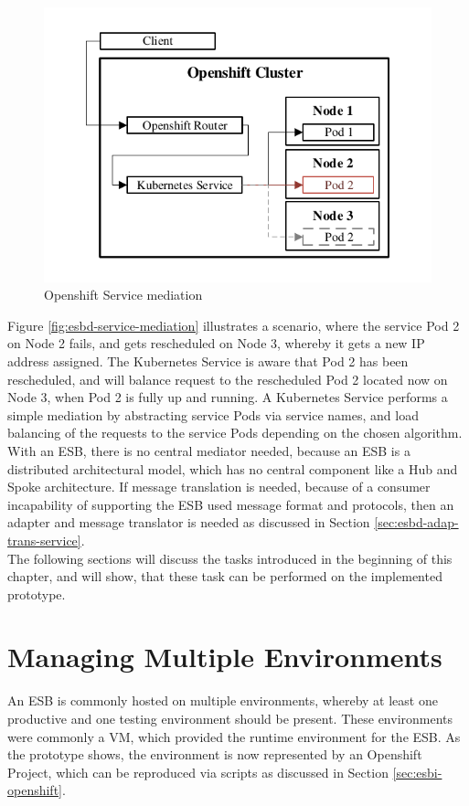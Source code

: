 \begin{figure}[htbp]
	\centering
	\includegraphics[scale=1]{images/esbd-service-mediation.pdf}
	\caption{Openshift Service mediation}
	\label{fig:esbd-service-mediation}
\end{figure}

Figure \vref{fig:esbd-service-mediation} illustrates a scenario, where the service Pod 2 on Node 2 fails, and gets rescheduled on Node 3, whereby it gets a new IP address assigned. The Kubernetes Service is aware that Pod 2 has been rescheduled, and will balance request to the rescheduled Pod 2 located now on Node 3, when Pod 2 is fully up and running. A Kubernetes Service performs a simple mediation by abstracting service Pods via service names, and load balancing of the requests to the service Pods depending on the chosen algorithm. \\

With an ESB, there is no central mediator needed, because an ESB is a distributed architectural model, which has no central component like a Hub and Spoke architecture. If message translation is needed, because of a consumer incapability of supporting the ESB used message format and protocols, then an adapter and message translator is needed as discussed in Section \vref{sec:esbd-adap-trans-service}. \\

The following sections will discuss the tasks introduced in the beginning of this chapter, and will show, that these task can be performed on the implemented prototype.

\section{Managing Multiple Environments}
\label{sec:esbd-multiple-env}
An ESB is commonly hosted on multiple environments, whereby at least one productive and one testing environment should be present. These environments were commonly a VM, which provided the runtime environment for the ESB. As the prototype shows, the environment is now represented by an Openshift Project, which can be reproduced via scripts as discussed in Section \vref{sec:esbi-openshift}. \\

